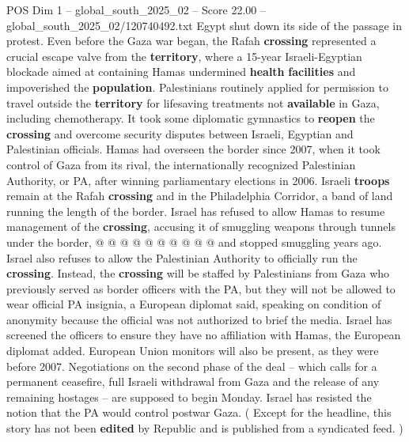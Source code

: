 \begin{textsample}{POS Dim 1 – global\_south\_2025\_02 – Score 22.00 – global\_south\_2025\_02/120740492.txt}
Egypt shut down its side of the passage in protest.
Even before the Gaza war began, the Rafah \textbf{crossing} represented a crucial escape valve from the \textbf{territory}, where a 15-year Israeli-Egyptian blockade aimed at containing Hamas undermined \textbf{health} \textbf{facilities} and impoverished the \textbf{population}.
Palestinians routinely applied for permission to travel outside the \textbf{territory} for lifesaving treatments not \textbf{available} in Gaza, including chemotherapy.
It took some diplomatic gymnastics to \textbf{reopen} the \textbf{crossing} and overcome security disputes between Israeli, Egyptian and Palestinian officials.
Hamas had overseen the border since 2007, when it took control of Gaza from its rival, the internationally recognized Palestinian Authority, or PA, after winning parliamentary elections in 2006.
Israeli \textbf{troops} remain at the Rafah \textbf{crossing} and in the Philadelphia Corridor, a band of land running the length of the border.
Israel has refused to allow Hamas to resume management of the \textbf{crossing}, accusing it of smuggling weapons through tunnels under the border, @ @ @ @ @ @ @ @ @ @ and stopped smuggling years ago.
Israel also refuses to allow the Palestinian Authority to officially run the \textbf{crossing}.
Instead, the \textbf{crossing} will be staffed by Palestinians from Gaza who previously served as border officers with the PA, but they will not be allowed to wear official PA insignia, a European diplomat said, speaking on condition of anonymity because the official was not authorized to brief the media.
Israel has screened the officers to ensure they have no affiliation with Hamas, the European diplomat added.
European Union monitors will also be present, as they were before 2007.
Negotiations on the second phase of the deal -- which calls for a permanent ceasefire, full Israeli withdrawal from Gaza and the release of any remaining hostages -- are supposed to begin Monday.
Israel has resisted the notion that the PA would control postwar Gaza. ( Except for the headline, this story has not been \textbf{edited} by Republic and is published from a syndicated feed. )

\end{textsample}
